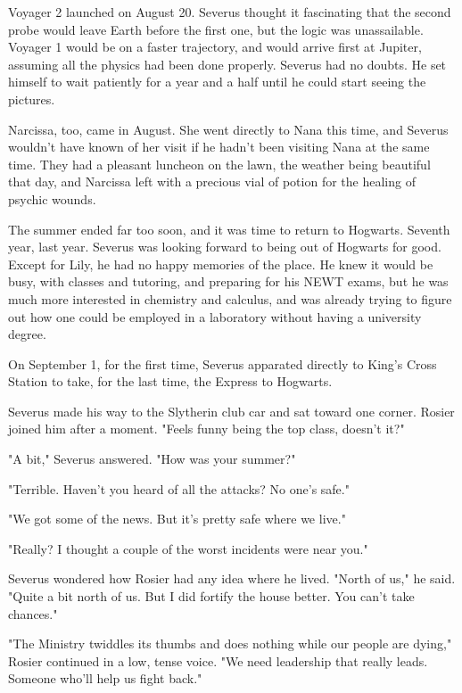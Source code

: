 Voyager 2 launched on August 20. Severus thought it fascinating that the second probe would leave Earth before the first one, but the logic was unassailable. Voyager 1 would be on a faster trajectory, and would arrive first at Jupiter, assuming all the physics had been done properly. Severus had no doubts. He set himself to wait patiently for a year and a half until he could start seeing the pictures.

Narcissa, too, came in August. She went directly to Nana this time, and Severus wouldn't have known of her visit if he hadn't been visiting Nana at the same time. They had a pleasant luncheon on the lawn, the weather being beautiful that day, and Narcissa left with a precious vial of potion for the healing of psychic wounds.

The summer ended far too soon, and it was time to return to Hogwarts. Seventh year, last year. Severus was looking forward to being out of Hogwarts for good. Except for Lily, he had no happy memories of the place. He knew it would be busy, with classes and tutoring, and preparing for his NEWT exams, but he was much more interested in chemistry and calculus, and was already trying to figure out how one could be employed in a laboratory without having a university degree.

On September 1, for the first time, Severus apparated directly to King's Cross Station to take, for the last time, the Express to Hogwarts.


Severus made his way to the Slytherin club car and sat toward one corner. Rosier joined him after a moment. "Feels funny being the top class, doesn't it?"

"A bit," Severus answered. "How was your summer?"

"Terrible. Haven't you heard of all the attacks? No one's safe."

"We got some of the news. But it's pretty safe where we live."

"Really? I thought a couple of the worst incidents were near you."

Severus wondered how Rosier had any idea where he lived. "North of us," he said. "Quite a bit north of us. But I did fortify the house better. You can't take chances."

"The Ministry twiddles its thumbs and does nothing while our people are dying," Rosier continued in a low, tense voice. "We need leadership that really leads. Someone who'll help us fight back."

